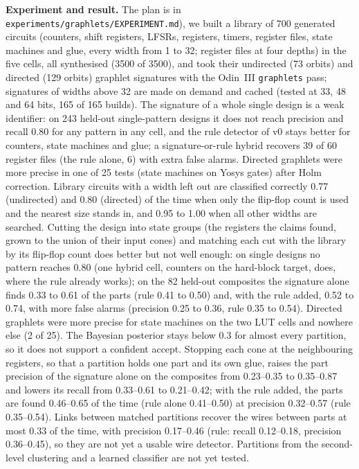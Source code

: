 \documentclass[conference]{IEEEtran}
\newcommand{\hev}[1]{\par\smallskip\noindent\textbf{#1}}
\newcommand{\code}[1]{\texttt{#1}}
\begin{document}
\hev{Experiment and result.} The plan is in
\code{experiments/graphlets/EXPERIMENT.md}), we built a library of 700 generated circuits (counters, shift registers, LFSRs, registers, timers,
register files, state machines and glue, every width from 1 to 32; register files at four depths) in the five cells, all synthesised (3500 of 3500),
and took their undirected (73 orbits) and directed (129 orbits) graphlet signatures with the Odin~III \code{graphlets} pass; signatures of widths above 32
are made on demand and cached (tested at 33, 48 and 64 bits, 165 of 165 builds). The signature of a whole single design is a weak identifier: on 243 held-out
single-pattern designs it does not reach precision and recall 0.80 for any pattern in any cell, and the rule detector of v0 stays better for counters, state
machines and glue; a signature-or-rule hybrid recovers 39 of 60 register files (the rule alone, 6) with extra false alarms. Directed graphlets were more
precise in one of 25 tests (state machines on Yosys gates) after Holm correction. Library circuits with a width left out are classified correctly 0.77
(undirected) and 0.80 (directed) of the time when only the flip-flop count is used and the nearest size stands in, and 0.95 to 1.00 when all other widths are searched.
Cutting the design into state groups (the registers the claims found, grown to the union of their input cones) and matching each cut with the library
by its flip-flop count does better but not well enough: on single designs no pattern reaches 0.80 (one hybrid cell, counters on the hard-block target, does,
where the rule already works); on the 82 held-out composites the signature alone finds 0.33 to 0.61 of the parts (rule 0.41 to 0.50) and, with the rule added,
0.52 to 0.74, with more false alarms (precision 0.25 to 0.36, rule 0.35 to 0.54). Directed graphlets were more precise for state machines on the two LUT cells and
nowhere else (2 of 25). The Bayesian posterior stays below 0.3 for almost every partition, so it does not support a confident accept. Stopping each cone at the neighbouring registers, so that a partition holds one part and its own glue, raises the part precision of the signature alone on the
composites from 0.23--0.35 to 0.35--0.87 and lowers its recall from 0.33--0.61 to 0.21--0.42; with the rule added, the parts are found 0.46--0.65 of the time
(rule alone 0.41--0.50) at precision 0.32--0.57 (rule 0.35--0.54). Links between matched partitions recover the wires between parts at most 0.33 of the time, with
precision 0.17--0.46 (rule: recall 0.12--0.18, precision 0.36--0.45), so they are not yet a usable wire detector. Partitions from the second-level clustering and a
learned classifier are not yet tested.
\end{document}
